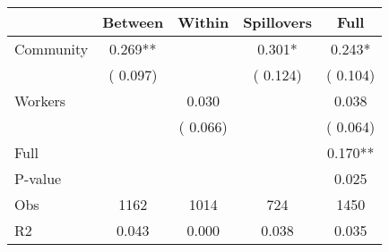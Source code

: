 
\begin{tabular}{l*{4}{c}}\hline&\multicolumn{1}{c}{Between}&\multicolumn{1}{c}{Within}&\multicolumn{1}{c}{Spillovers}&\multicolumn{1}{c}{Full}\\ \hline
 Community             &              0.269**      &                                               &        0.301* &         0.243*                            \\ 
                               &        (       0.097)           &                                       &       (       0.124)     &      (       0.104)                                           \\ 
 Workers       &                                               &        0.030    &                                &             0.038                            \\ 
                               &                                               & (       0.066)                  &                                        &      (       0.064)                                           \\ 
\hline                                                                                                                                                                                                                                            
 Full                  &                                               &                                               &                                        &             0.170**                                     \\ 
 P-value               &                                               &                                               &                                        &             0.025                                           \\ 
 Obs                   &               1162               &       1014                       &       724                &              1450                                               \\ 
 R2                    &                      0.043              &              0.000                      &              0.038               &                     0.035                                              \\ 
\hline \end{tabular}                                                                                                                                                                                                              